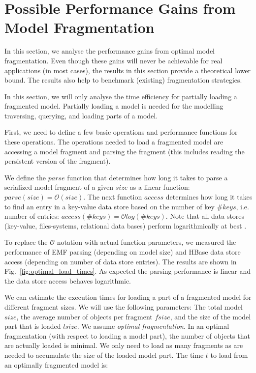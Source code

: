 \section{Possible Performance Gains from Model Fragmentation}

In this section, we analyse the performance gains from optimal model fragmentation. Even though these gains will never be achievable for real applications (in most cases), the results in this section provide a theoretical lower bound. The results also help to benchmark (existing) fragmentation strategies. 

In this section, we will only analyse the time efficiency for partially loading a fragmented model. Partially loading a model is needed for the modelling traversing, querying, and loading parts of a model.

First, we need to define a few basic operations and performance functions for these operations. The operations needed to load a fragmented model are accessing a model fragment and parsing the fragment (this includes reading the persistent version of the fragment). 

We define the $parse$ function that determines how long it takes to parse a serialized model fragment of a given $size$ as a linear function: $parse(size)=\mathcal{O}\left(size\right)$. The next function $access$ determines how long it takes to find an entry in a key-value data store based on the number of key $\#keys$, i.e. number of entries: $access(\#keys)=\mathcal{O}log(\#keys)$.
Note that all data stores (key-value, files-systems, relational data bases) perform logarithmically at best .

To replace the $\mathcal{O}$-notation with actual function parameters, we measured the performance of EMF parsing (depending on model size) and HBase data store access (depending on number of data store entries). The results are shown in Fig.~\ref{fig:optimal_load_times}. As expected the parsing performance is linear and the data store access behaves logarithmic. 

We can estimate the execution times for loading a part of a fragmented model for different fragment sizes. We will use the following parameters: The total model $size$, the average number of objects per fragment $fsize$, and the size of the model part that is loaded $lsize$. We assume \emph{optimal fragmentation}. In an optimal fragmentation (with respect to loading a model part), the number of objects that are actually loaded is minimal. We only need to load as many fragments as are needed to accumulate the size of the loaded model part. The time $t$ to load from an optimally fragmented model is:

